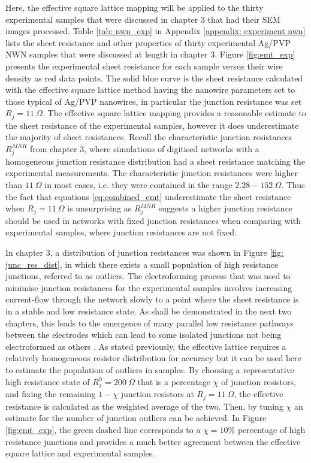 Here, the effective square lattice mapping will be applied to the thirty experimental samples that were discussed in chapter 3 that had their SEM images processed. Table \ref{tab: nwn_exp} in Appendix \ref{appendix: experiment nwn} lists the sheet resistance and other properties of thirty experimental Ag/PVP NWN samples that were discussed at length in chapter 3. Figure \ref{fig:emt_exp} presents the experimental sheet resistance for each sample versus their wire density as red data points. The solid blue curve is the sheet resistance calculated with the effective square lattice method having the nanowire parameters set to those typical of Ag/PVP nanowires, in particular the junction resistance was set $R_j = 11 ~ \Omega$. The effective square lattice mapping provides a reasonable estimate to the sheet resistance of the experimental samples, however it does underestimate the majority of sheet resistances. Recall the characteristic junction resistances $R_j^{MNR}$ from chapter 3, where simulations of digitised networks with a homogeneous junction resistance distribution had a sheet resistance matching the experimental measurements. The characteristic junction resistances were higher than $11 ~ \Omega$ in most cases, i.e. they were contained in the range $2.28-152 ~ \Omega$. Thus the fact that equations \ref{eq:combined_emt} underestimate the sheet resistance when $R_j= 11 ~\Omega$ is unsurprising as $R_j^{MNR}$ suggests a higher junction resistance should be used in networks with fixed junction resistances when comparing with experimental samples, where junction resistances are not fixed.

In chapter 3, a distribution of junction resistances was shown in Figure \ref{fig: junc_res_dist}, in which there exists a small population of high resistance junctions, referred to as outliers. The electroforming process that was used to minimise junction resistances for the experimental samples involves increasing current-flow through the network slowly to a point where the sheet resistance is in a stable and low resistance state\cite{bellew2015}. As shall be demonstrated in the next two chapters, this leads to the emergence of many parallel low resistance pathways between the electrodes which can lead to some isolated junctions not being electroformed as others \cite{bellew2015}. As stated previously, the effective lattice requires a relatively homogeneous resistor distribution for accuracy but it can be used here to estimate the population of outliers in samples. By choosing a representative high resistance state of $R_j^h = 200 ~ \Omega$ that is a percentage $\chi$ of junction resistors, and fixing the remaining $1-\chi$ junction resistors at $R_j = 11 ~ \Omega$, the effective resistance is calculated as the weighted average of the two. Then, by tuning $\chi$ an estimate for the number of junction outliers can be achieved. In Figure \ref{fig:emt_exp}, the green dashed line corresponds to a $\chi = 10\%$ percentage of high resistance junctions and provides a much better agreement between the effective square lattice and experimental samples.

